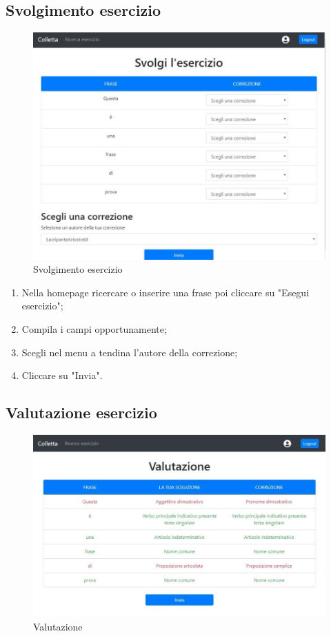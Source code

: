 \documentclass[11pt,a4paper]{article}
\begin{document}
{\begin{enumerate}
	\end{enumerate}
	
	\subsection{Svolgimento esercizio}
	\begin{figure}[h!]
		\centering
		\includegraphics[scale=0.65]{images/svolgimento.jpg}
		\caption{Svolgimento esercizio}
	\end{figure}
	\begin{enumerate}
		\item Nella homepage ricercare o inserire una frase poi cliccare su "Esegui esercizio";
		\item Compila i campi opportunamente;
		\item Scegli nel menu a tendina l'autore della correzione;
		\item Cliccare su "Invia".
	\end{enumerate}

	\subsection{Valutazione esercizio}
		\begin{figure}[h!]
		\centering
		\includegraphics[scale=0.65]{images/valutazione.jpg}
		\caption{Valutazione}
	\end{figure}
	
}
\end{document}
